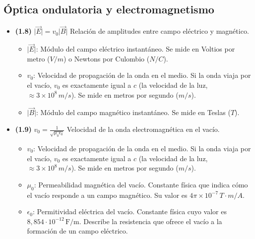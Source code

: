 \documentclass{article}
\begin{document}
		\subsection*{Óptica ondulatoria y electromagnetismo}
			\begin{itemize}
				\item \textbf{(1.8)} $\boxed{\vert{}\vec{E}\vert{}=v_{0}\vert{}\vec{B}\vert{}}$ Relación de amplitudes entre campo eléctrico y magnético.
					\begin{itemize}
						\item $\vert{}\vec{E}\vert{}$: Módulo del campo eléctrico instantáneo. Se mide en Voltios por metro ($V/m$) o Newtons por Culombio ($N/C$).
						\item $v_0$: Velocidad de propagación de la onda en el medio. Si la onda viaja por el vacío, $v_0$ es exactamente igual a $c$ (la velocidad de la luz, $\approx 3 \times 10^8 \, m/s$). Se mide en metros por segundo ($m/s$).
						\item $\vert{}\vec{B}\vert{}$: Módulo del campo magnético instantáneo. Se mide en Teslas ($T$).
					\end{itemize}

				\item \textbf{(1.9)} $\boxed{v_{0}=\frac{1}{\sqrt{\mu_{0}\epsilon_{0}}}}$ Velocidad de la onda electromagnética en el vacío.
					\begin{itemize}
						\item $v_0$: Velocidad de propagación de la onda en el medio. Si la onda viaja por el vacío, $v_0$ es exactamente igual a $c$ (la velocidad de la luz, $\approx 3 \times 10^8 \, m/s$). Se mide en metros por segundo ($m/s$).
						\item $\mu_0$: Permeabilidad magnética del vacío. Constante física que indica cómo el vacío responde a un campo magnético. Su valor es $4\pi \times 10^{-7} \, T\cdot m/A$.
						\item $\epsilon_{0}$: Permitividad eléctrica del vacío. Constante física cuyo valor es $8,854\cdot10^{-12}\,\text{F/m}$. Describe la resistencia que ofrece el vacío a la formación de un campo eléctrico.
					\end{itemize}


\end{itemize}
\end{document}

